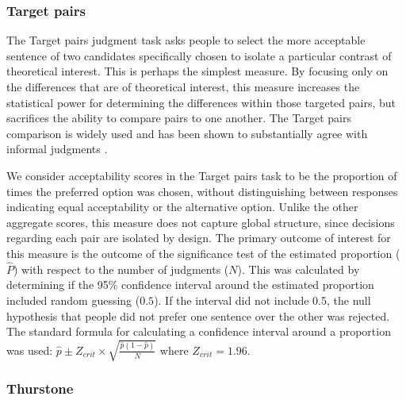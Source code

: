 \documentclass[doc]{apa6}
\newcommand{\targchoice}{{\sc Target pairs}}
\begin{document}
\subsubsection{Target pairs}

The \targchoice{} judgment task asks people to select the more acceptable sentence of two candidates specifically chosen to isolate a particular contrast of theoretical interest. This is perhaps the simplest measure. By focusing only on the differences that are of theoretical interest, this measure increases the statistical power for determining the differences within those targeted pairs, but sacrifices the ability to compare pairs to one another. The \targchoice{} comparison is widely used \citep{rosenbach2003FCexample,myers2009smallexpdesign} and has been shown to substantially agree with informal judgments \citep{sprouse2011poweracceptabilityjudgment,sprouse2013formalinformal}.

We consider acceptability scores in the \targchoice{} task to be the proportion of times the preferred option was chosen, without distinguishing between responses indicating equal acceptability or the alternative option. Unlike the other aggregate scores, this measure does not capture global structure, since decisions regarding each pair are isolated by design.
The primary outcome of interest for this measure is the outcome of the significance test of the estimated proportion ($\hat{P}$) with respect to the number of judgments ($N$).
This was calculated by determining if the 95\% confidence interval around the estimated proportion included random guessing ($0.5$). If the interval did not include 0.5, the null hypothesis that people did not prefer one sentence over the other was rejected. The standard formula for calculating a confidence interval around a proportion was used: $\hat{p} \pm Z_{crit} \times \sqrt{\frac{\hat{p}(1-\hat{p})}{N}}$ where $Z_{crit} = 1.96$.

\subsubsection{Thurstone}
\end{document}
